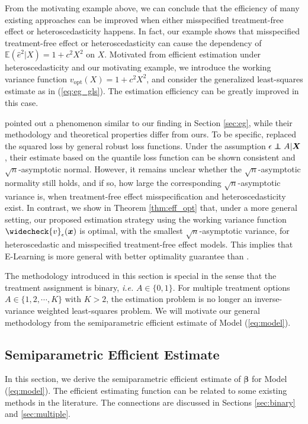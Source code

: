 \documentclass[11pt]{article}
\theoremstyle{definition}
\theoremstyle{remark}
\newcommand{\bx}{\bm{x}}
\newcommand{\bX}{\bm{X}}
\newcommand{\bbeta}{\bm{\beta}}
\newcommand{\bbE}{\mathbb{E}}
\newcommand\indep{\protect\mathpalette{\protect\independenT}{\perp}}
\def\independenT#1#2{\mathrel{\rlap{$#1#2$}\mkern2mu{#1#2}}}	%
\newcommand{\opt}{\mathrm{opt}}
\begin{document}
From the motivating example above, we can conclude that the efficiency of many existing approaches can be improved when either misspecified treatment-free effect or heteroscedasticity happens. In fact, our example shows that misspecified treatment-free effect or heteroscedasticity can cause the dependency of $ \bbE(\widehat{e}^{2}|X) = 1 + c^{2}X^{2} $ on $ X $. Motivated from efficient estimation under heteroscedasticity \citep{ma2006efficient} and our motivating example, we introduce the working variance function $ v_{\opt}(X) = 1 + c^{2}X^{2} $, and consider the generalized least-squares estimate as in (\ref{eq:eg_gls}). The estimation efficiency can be greatly improved in this case. 

\citet[Theorem 6]{xiao2019robust} pointed out a phenomenon similar to our finding in Section \ref{sec:eg}, while their methodology and theoretical properties differ from ours. To be specific, \citet{xiao2019robust} replaced the squared loss by general robust loss functions. Under the assumption $ \epsilon \indep A|\bX $, their estimate based on the quantile loss function can be shown consistent and $ \sqrt{n} $-asymptotic normal. However, it remains unclear whether the $\sqrt{n}$-asymptotic normality still holds, and if so, how large the corresponding $ \sqrt{n} $-asymptotic variance is, when treatment-free effect misspecification and heteroscedasticity exist. In contrast, we show in Theorem \ref{thm:eff_opt} that, under a more general setting, our proposed estimation strategy using the working variance function $ \widecheck{v}_{\epsilon}(\bx) $ is optimal, with the smallest $ \sqrt{n} $-asymptotic variance, for heteroscedastic and misspecified treatment-free effect models. This implies that E-Learning is more general with better optimality guarantee than \citet{xiao2019robust}.

The methodology introduced in this section is special in the sense that the treatment assignment is binary, \textit{i.e.} $ A \in \{0,1\} $. For multiple treatment options $ A \in \{ 1,2,\cdots,K \} $ with $ K > 2 $, the estimation problem is no longer an inverse-variance weighted least-squares problem. We will motivate our general methodology from the semiparametric efficient estimate of Model (\ref{eq:model}).


\subsection{Semiparametric Efficient Estimate}\label{sec:eff}
In this section, we derive the semiparametric efficient estimate of $ \bbeta $ for Model (\ref{eq:model}). The efficient estimating function can be related to some existing methods in the literature. The connections are discussed in Sections \ref{sec:binary} and \ref{sec:multiple}.
\end{document}
